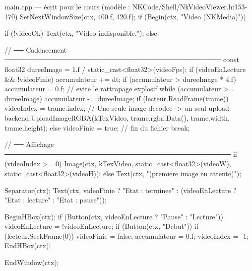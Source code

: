 \begin{nkcode}{main.cpp — écrit pour le cours (modèle : NKCode/Shell/NkVideoViewer.h:153-170)}
        SetNextWindowSize(ctx, 400.f, 420.f);
        if (Begin(ctx, "Video (NKMedia)")) {
            if (!videoOk) {
                Text(ctx, "Video indisponible.");
            } else {
                // ── Cadencement ────────────────────────────────────────────
                const float32 dureeImage = 1.f / static_cast<float32>(videoFps);
                if (videoEnLecture && !videoFinie) {
                    accumulateur += dt;
                    if (accumulateur > dureeImage * 4.f)
                        accumulateur = 0.f;          // evite le rattrapage explosif
                    while (accumulateur >= dureeImage) {
                        accumulateur -= dureeImage;
                        if (lecteur.ReadFrame(trame)) {
                            videoIndex = trame.index;
                            // Une seule image decodee -> un seul upload.
                            backend.UploadImageRGBA(kTexVideo, trame.rgba.Data(), trame.width, trame.height);
                        } else {
                            videoFinie = true;       // fin du fichier
                            break;
                        }
                    }
                }

                // ── Affichage ──────────────────────────────────────────────
                if (videoIndex >= 0)
                    Image(ctx, kTexVideo, static_cast<float32>(videoW), static_cast<float32>(videoH));
                else
                    Text(ctx, "(premiere image en attente)");

                Separator(ctx);
                Text(ctx, videoFinie ? "Etat : terminee" : (videoEnLecture ? "Etat : lecture" : "Etat : pause"));

                BeginHBox(ctx);
                if (Button(ctx, videoEnLecture ? "Pause" : "Lecture"))
                    videoEnLecture = !videoEnLecture;
                if (Button(ctx, "Debut")) {
                    if (lecteur.SeekFrame(0)) {
                        videoFinie = false;
                        accumulateur = 0.f;
                        videoIndex = -1;
                    }
                }
                EndHBox(ctx);
            }
            EndWindow(ctx);
        }
\end{nkcode}

